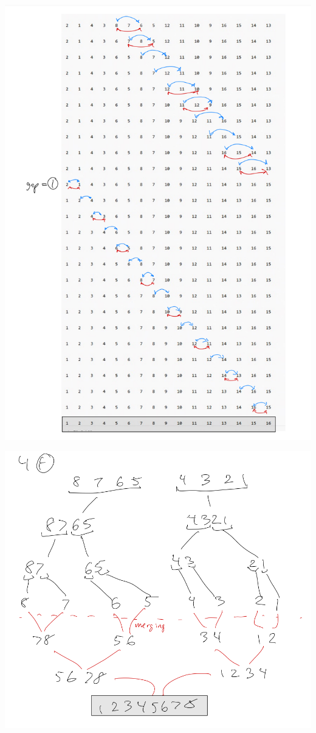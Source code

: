 \documentclass[11pt,largemargins]{homework}
\begin{document}
\begin{alphaparts}
  \includegraphics[width=1\textwidth]{pictures/hw1/4e2.png}

  \newpage
  \questionpart

  \includegraphics[width=1\textwidth]{pictures/hw1/4f.png}


\end{alphaparts}
\end{document}
